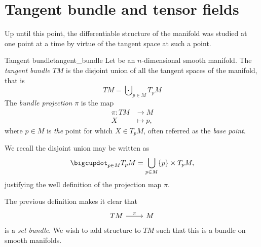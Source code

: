 \section{Tangent bundle and tensor fields}
Up until this point, the differentiable structure of the manifold was studied at one point at a time by virtue of the tangent space at such a point.

\begin{definition}{Tangent bundle}{tangent_bundle}
    Let  be an \(n\)-dimensional smooth manifold. The \emph{tangent bundle }\(TM\) is the disjoint union of all the tangent spaces of the manifold, that is
    \begin{equation*}
        TM = \bigcupdot_{p \in M} T_pM
    \end{equation*}
    The \emph{bundle projection} \(\pi\) is the map
    \begin{align*}
        \pi : TM &\to M\\
               X &\mapsto p,
    \end{align*}
    where \(p \in M\) is \emph{the} point for which \(X \in T_pM\), often referred as the \emph{base point}.
\end{definition}
\begin{remark}
    We recall the disjoint union may be written as
    \begin{equation*}
        \bigcupdot_{p\in M} T_pM = \bigcup_{p \in M} \set*{p} \times T_pM,
    \end{equation*}
    justifying the well definition of the projection map \(\pi\).
\end{remark}

The previous definition makes it clear that
\begin{equation*}
    \begin{tikzcd}[column sep = normal, row sep = large]
        TM \arrow{r}{\pi} & M
    \end{tikzcd}
\end{equation*}
is a \emph{set bundle}. We wish to add structure to \(TM\) such that this is a bundle on smooth manifolds.

